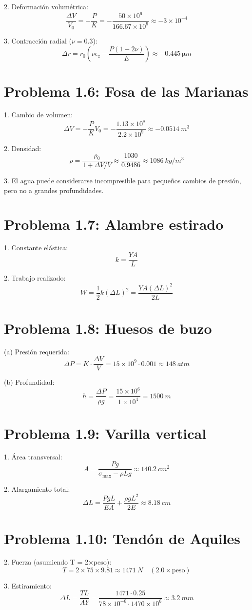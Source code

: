 \documentclass{article}
\begin{document}
2. Deformación volumétrica:
\[
\frac{\Delta V}{V_0} = -\frac{P}{K} = -\frac{50 \times 10^6}{166.67 \times 10^9} \approx \boxed{-3 \times 10^{-4}}
\]

3. Contracción radial ($\nu = 0.3$):
\[
\Delta r = r_0 \left(\nu \epsilon_z - \frac{P(1-2\nu)}{E}\right) \approx \boxed{\SI{-0.445}{\micro m}}
\]

\section*{Problema 1.6: Fosa de las Marianas}
1. Cambio de volumen:
\[
\Delta V = -\frac{P}{K} V_0 = -\frac{1.13 \times 10^8}{2.2 \times 10^9} \approx \boxed{\SI{-0.0514}{m^3}}
\]

2. Densidad:
\[
\rho = \frac{\rho_0}{1 + \Delta V/V} \approx \frac{1030}{0.9486} \approx \boxed{\SI{1086}{kg/m^3}}
\]

3. El agua puede considerarse incompresible para pequeños cambios de presión, pero no a grandes profundidades.

\section*{Problema 1.7: Alambre estirado}
1. Constante elástica:
\[
k = \frac{Y A}{L}
\]

2. Trabajo realizado:
\[
W = \frac{1}{2} k (\Delta L)^2 = \frac{Y A (\Delta L)^2}{2 L}
\]

\section*{Problema 1.8: Huesos de buzo}
(a) Presión requerida:
\[
\Delta P = K \cdot \frac{\Delta V}{V} = 15 \times 10^9 \cdot 0.001 \approx \boxed{\SI{148}{atm}}
\]

(b) Profundidad:
\[
h = \frac{\Delta P}{\rho g} = \frac{15 \times 10^6}{1 \times 10^4} = \boxed{\SI{1500}{m}}
\]

\section*{Problema 1.9: Varilla vertical}
1. Área transversal:
\[
A = \frac{P g}{\sigma_{\text{max}} - \rho L g} \approx \boxed{\SI{140.2}{cm^2}}
\]

2. Alargamiento total:
\[
\Delta L = \frac{P g L}{E A} + \frac{\rho g L^2}{2 E} \approx \boxed{\SI{8.18}{cm}}
\]

\section*{Problema 1.10: Tendón de Aquiles}
2. Fuerza (asumiendo T = 2×peso):
\[
T = 2 \times 75 \times 9.81 \approx \boxed{\SI{1471}{N}} \quad (2.0 \times \text{peso})
\]

3. Estiramiento:
\[
\Delta L = \frac{T L}{A Y} = \frac{1471 \cdot 0.25}{78 \times 10^{-6} \cdot 1470 \times 10^6} \approx \boxed{\SI{3.2}{mm}}
\]
\end{document}
